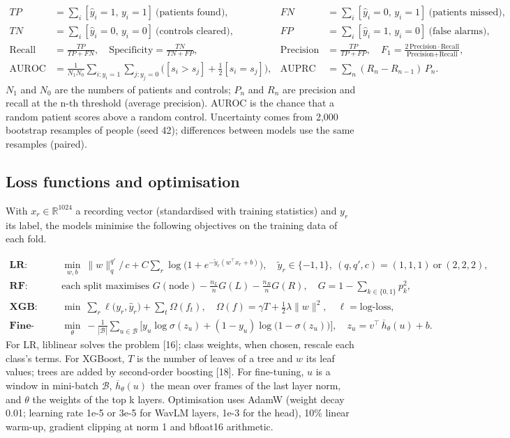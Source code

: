 \documentclass[11pt,a4paper]{article}
\begin{document}
\begin{align*}TP&=\textstyle\sum_i[\hat y_i=1,\,y_i=1]\ \text{(patients found)}, & FN&=\textstyle\sum_i[\hat y_i=0,\,y_i=1]\ \text{(patients missed)},\\ TN&=\textstyle\sum_i[\hat y_i=0,\,y_i=0]\ \text{(controls cleared)}, & FP&=\textstyle\sum_i[\hat y_i=1,\,y_i=0]\ \text{(false alarms)},\\ \text{Recall}&=\frac{TP}{TP+FN}, \quad \text{Specificity}=\frac{TN}{TN+FP}, & \text{Precision}&=\frac{TP}{TP+FP}, \quad F_1=\frac{2\,\text{Precision}\cdot\text{Recall}}{\text{Precision}+\text{Recall}},\\ \text{AUROC}&=\frac{1}{N_1N_0}\sum_{i:y_i=1}\sum_{j:y_j=0}\Big([s_i>s_j]+\tfrac12[s_i=s_j]\Big), & \text{AUPRC}&=\sum_{n}(R_n-R_{n-1})\,P_n .\end{align*}
$N_1$ and $N_0$ are the numbers of patients and controls; $P_n$ and $R_n$ are precision and recall at the n-th threshold (average precision). AUROC is the chance that a random patient scores above a random control. Uncertainty comes from 2,000 bootstrap resamples of people (seed 42); differences between models use the same resamples (paired).

\subsection{Loss functions and optimisation}\label{sec:loss}
With $x_r \in \mathbb{R}^{1024}$ a recording vector (standardised with training statistics) and $y_r$ its label, the models minimise the following objectives on the training data of each fold.

\begin{align*}\textbf{LR:}\quad &\min_{w,b}\ \lVert w\rVert_q^{q'}\!/\,\!c + C\sum_r \log\big(1+e^{-\tilde y_r(w^\top x_r+b)}\big),\quad \tilde y_r\in\{-1,1\},\ (q,q',c)=(1,1,1)\ \text{or}\ (2,2,2),\\ \textbf{RF:}\quad &\text{each split maximises } G(\text{node})-\tfrac{n_L}{n}G(L)-\tfrac{n_R}{n}G(R),\quad G=1-\textstyle\sum_{k\in\{0,1\}}p_k^2,\\ \textbf{XGB:}\quad &\min\ \textstyle\sum_r \ell\big(y_r,\hat y_r\big)+\sum_{t}\Omega(f_t),\quad \Omega(f)=\gamma T+\tfrac12\lambda\lVert w\rVert^2,\quad \ell=\text{log-loss},\\ \textbf{Fine-tuning:}\quad &\min_{\theta}\ -\frac{1}{|\mathcal{B}|}\sum_{u\in\mathcal{B}}\Big[y_u\log\sigma(z_u)+(1-y_u)\log\big(1-\sigma(z_u)\big)\Big],\quad z_u=v^\top\,\overline{h}_\theta(u)+b .\end{align*}
For LR, liblinear solves the problem [16]; class weights, when chosen, rescale each class's terms. For XGBoost, $T$ is the number of leaves of a tree and $w$ its leaf values; trees are added by second-order boosting [18]. For fine-tuning, $u$ is a window in mini-batch $\mathcal{B}$, $\overline{h}_\theta(u)$ the mean over frames of the last layer norm, and $\theta$ the weights of the top k layers. Optimisation uses AdamW (weight decay 0.01; learning rate 1e-5 or 3e-5 for WavLM layers, 1e-3 for the head), 10\% linear warm-up, gradient clipping at norm 1 and bfloat16 arithmetic.
\end{document}
